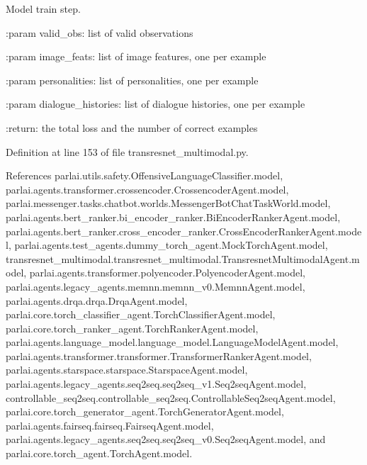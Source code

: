 \begin{DoxyVerb}Model train step.

:param valid_obs:
    list of valid observations

:param image_feats:
    list of image features, one per example

:param personalities:
    list of personalities, one per example

:param dialogue_histories:
    list of dialogue histories, one per example

:return:
    the total loss and the number of correct examples
\end{DoxyVerb}
 

Definition at line 153 of file transresnet\+\_\+multimodal.\+py.



References parlai.\+utils.\+safety.\+Offensive\+Language\+Classifier.\+model, parlai.\+agents.\+transformer.\+crossencoder.\+Crossencoder\+Agent.\+model, parlai.\+messenger.\+tasks.\+chatbot.\+worlds.\+Messenger\+Bot\+Chat\+Task\+World.\+model, parlai.\+agents.\+bert\+\_\+ranker.\+bi\+\_\+encoder\+\_\+ranker.\+Bi\+Encoder\+Ranker\+Agent.\+model, parlai.\+agents.\+bert\+\_\+ranker.\+cross\+\_\+encoder\+\_\+ranker.\+Cross\+Encoder\+Ranker\+Agent.\+model, parlai.\+agents.\+test\+\_\+agents.\+dummy\+\_\+torch\+\_\+agent.\+Mock\+Torch\+Agent.\+model, transresnet\+\_\+multimodal.\+transresnet\+\_\+multimodal.\+Transresnet\+Multimodal\+Agent.\+model, parlai.\+agents.\+transformer.\+polyencoder.\+Polyencoder\+Agent.\+model, parlai.\+agents.\+legacy\+\_\+agents.\+memnn.\+memnn\+\_\+v0.\+Memnn\+Agent.\+model, parlai.\+agents.\+drqa.\+drqa.\+Drqa\+Agent.\+model, parlai.\+core.\+torch\+\_\+classifier\+\_\+agent.\+Torch\+Classifier\+Agent.\+model, parlai.\+core.\+torch\+\_\+ranker\+\_\+agent.\+Torch\+Ranker\+Agent.\+model, parlai.\+agents.\+language\+\_\+model.\+language\+\_\+model.\+Language\+Model\+Agent.\+model, parlai.\+agents.\+transformer.\+transformer.\+Transformer\+Ranker\+Agent.\+model, parlai.\+agents.\+starspace.\+starspace.\+Starspace\+Agent.\+model, parlai.\+agents.\+legacy\+\_\+agents.\+seq2seq.\+seq2seq\+\_\+v1.\+Seq2seq\+Agent.\+model, controllable\+\_\+seq2seq.\+controllable\+\_\+seq2seq.\+Controllable\+Seq2seq\+Agent.\+model, parlai.\+core.\+torch\+\_\+generator\+\_\+agent.\+Torch\+Generator\+Agent.\+model, parlai.\+agents.\+fairseq.\+fairseq.\+Fairseq\+Agent.\+model, parlai.\+agents.\+legacy\+\_\+agents.\+seq2seq.\+seq2seq\+\_\+v0.\+Seq2seq\+Agent.\+model, and parlai.\+core.\+torch\+\_\+agent.\+Torch\+Agent.\+model.



